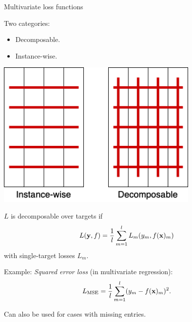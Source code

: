 \documentclass[11pt,compress,t,notes=noshow, xcolor=table]{beamer}
\begin{document}
\begin{frame}{Multivariate loss functions}
	\begin{itemize}
		\begin{minipage}{0.45\textwidth}	
			\item Two categories: 
            \begin{itemize}
                \item Decomposable.
                \item Instance-wise.
            \end{itemize}
		\end{minipage}
		\begin{minipage}{0.45\textwidth}
			\begin{center}
				\includegraphics[width=0.75\textwidth]{figure/fmeasure}
			\end{center}
		\end{minipage}
		
		\item $L$ is decomposable over targets if
		$$
		L(\mathbf{y}, f) = \frac{1}{l} \sum_{m=1}^l L_m(y_m, f(\mathbf{x})_m) 
		$$
		with single-target losses $L_m$.     
     
		\item Example: \emph{Squared error loss} (in multivariate regression):
		$$
		L_{\text{MSE}} = \frac{1}{l}\sum_{m=1}^l (y_m - f(\mathbf{x})_m)^2.
		$$
        \item Can also be used for cases with missing entries.
		
	\end{itemize}
\end{frame}
\end{document}
